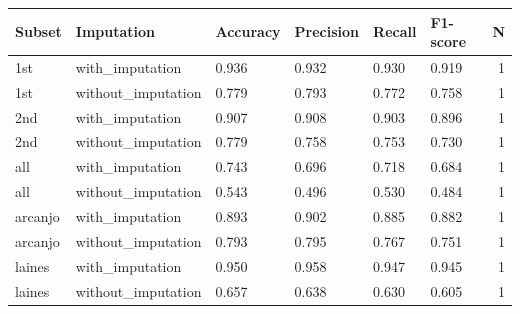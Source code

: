 \begin{tabular}{llllllr}
\toprule
 Subset &         Imputation & Accuracy & Precision & Recall & F1-score &  N \\
\midrule
    1st &    with_imputation &    0.936 &     0.932 &  0.930 &    0.919 &  1 \\
    1st & without_imputation &    0.779 &     0.793 &  0.772 &    0.758 &  1 \\
    2nd &    with_imputation &    0.907 &     0.908 &  0.903 &    0.896 &  1 \\
    2nd & without_imputation &    0.779 &     0.758 &  0.753 &    0.730 &  1 \\
    all &    with_imputation &    0.743 &     0.696 &  0.718 &    0.684 &  1 \\
    all & without_imputation &    0.543 &     0.496 &  0.530 &    0.484 &  1 \\
arcanjo &    with_imputation &    0.893 &     0.902 &  0.885 &    0.882 &  1 \\
arcanjo & without_imputation &    0.793 &     0.795 &  0.767 &    0.751 &  1 \\
 laines &    with_imputation &    0.950 &     0.958 &  0.947 &    0.945 &  1 \\
 laines & without_imputation &    0.657 &     0.638 &  0.630 &    0.605 &  1 \\
\bottomrule
\end{tabular}
